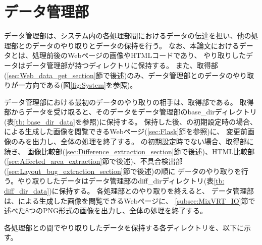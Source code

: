 \section{データ管理部}\label{sec:data_admin_section}
データ管理部は、システム内の各処理部間におけるデータの伝達を担い、他の処理部とのデータのやり取りとデータの保持を行う。
なお、本論文におけるデータとは、処理前後のWebページの画像やHTMLコードであり、
やり取りしたデータはデータ管理部が持つディレクトリに保持する。
また、取得部(\ref{sec:Web_data_get_section}節で後述)のみ、データ管理部とのデータのやり取りが一方向である(図\ref{fig:System}を参照)。
\par
データ管理部における最初のデータのやり取りの相手は、取得部である。
取得部からデータを受け取ると、そのデータをデータ管理部のbase\_dirディレクトリ(表\ref{tb: base_dir_data}を参照)に保持する。
保持した後、\toolName の初期設定時の場合、
\toolName による生成した画像を閲覧できるWebページ(\ref{sec:Flask}節を参照)に、
変更前画像のみを出力し、全体の処理を終了する。
\toolName の初期設定時でない場合、取得部に続き、
画像比較部(\ref{sec:Difference_extraction_section}節で後述)、HTML比較部(\ref{sec:Affected_area_extraction}節で後述)、不具合検出部(\ref{sec:Layout_bug_extraction_section}節で後述)の順に
データのやり取りを行う。やり取りしたデータはデータ管理部のdiff\_dirディレクトリ(表\ref{tb: diff_dir_data})に保持する。
各処理部とのやり取りを終えると、
データ管理部は、\toolName による生成した画像を閲覧できるWebページに、
\ref{subsec:MixVRT_IO}節で述べた8つのPNG形式の画像を出力し、全体の処理を終了する。
\par
各処理部との間でやり取りしたデータを保持する各ディレクトリを、以下に示す。

